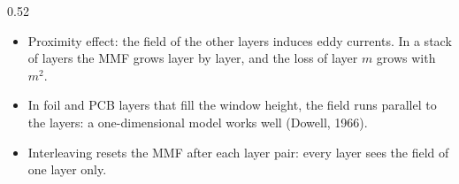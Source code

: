 \begin{frame}
\begin{columns}[T]
\begin{column}{0.52\textwidth}
\begin{itemize}
				\item Proximity effect: the field of the other layers induces eddy currents. In a stack of layers the MMF grows layer by layer, and the loss of layer $m$ grows with $m^2$.
				\item In foil and PCB layers that fill the window height, the field runs parallel to the layers: a one-dimensional model works well (Dowell, 1966).
				\item Interleaving resets the MMF after each layer pair: every layer sees the field of one layer only.
			\end{itemize}
		\end{column}
	\end{columns}
\end{frame}

